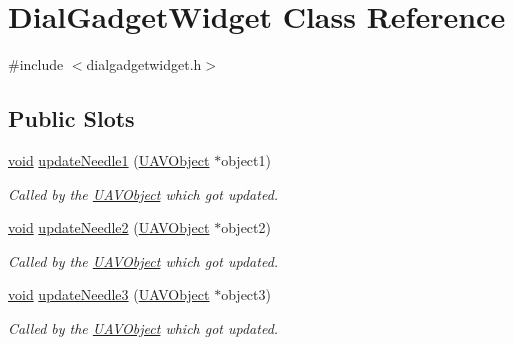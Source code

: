 \hypertarget{class_dial_gadget_widget}{\section{\-Dial\-Gadget\-Widget \-Class \-Reference}
\label{class_dial_gadget_widget}
}


{\ttfamily \#include $<$dialgadgetwidget.\-h$>$}

\subsection*{\-Public \-Slots}
\begin{DoxyCompactItemize}
\item 
\hyperlink{group___u_a_v_objects_plugin_ga444cf2ff3f0ecbe028adce838d373f5c}{void} \hyperlink{group___dial_plugin_ga20f0bcc550ca92ec3bd40b4cf0b2a38e}{update\-Needle1} (\hyperlink{class_u_a_v_object}{\-U\-A\-V\-Object} $\ast$object1)
\begin{DoxyCompactList}\small\item\em \-Called by the \hyperlink{class_u_a_v_object}{\-U\-A\-V\-Object} which got updated. \end{DoxyCompactList}\item 
\hyperlink{group___u_a_v_objects_plugin_ga444cf2ff3f0ecbe028adce838d373f5c}{void} \hyperlink{group___dial_plugin_gaf88f5db2a7b289050e6dc6a8cda27e0f}{update\-Needle2} (\hyperlink{class_u_a_v_object}{\-U\-A\-V\-Object} $\ast$object2)
\begin{DoxyCompactList}\small\item\em \-Called by the \hyperlink{class_u_a_v_object}{\-U\-A\-V\-Object} which got updated. \end{DoxyCompactList}\item 
\hyperlink{group___u_a_v_objects_plugin_ga444cf2ff3f0ecbe028adce838d373f5c}{void} \hyperlink{group___dial_plugin_gad0f863a46778ffadd8bf6dbdc01c4c81}{update\-Needle3} (\hyperlink{class_u_a_v_object}{\-U\-A\-V\-Object} $\ast$object3)
\begin{DoxyCompactList}\small\item\em \-Called by the \hyperlink{class_u_a_v_object}{\-U\-A\-V\-Object} which got updated. \end{DoxyCompactList}\end{DoxyCompactItemize}
